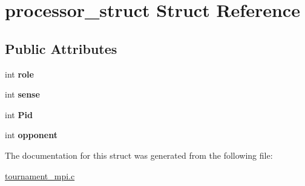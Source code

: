 \hypertarget{structprocessor__struct}{\section{processor\-\_\-struct \-Struct \-Reference}
\label{structprocessor__struct}
}
\subsection*{\-Public \-Attributes}
\begin{DoxyCompactItemize}
\item 
\hypertarget{structprocessor__struct_a797d3ab462f03421de68c0d00a2dca9d}{int {\bfseries role}}\label{structprocessor__struct_a797d3ab462f03421de68c0d00a2dca9d}

\item 
\hypertarget{structprocessor__struct_af61f03a7e74429989421bd6f45387b12}{int {\bfseries sense}}\label{structprocessor__struct_af61f03a7e74429989421bd6f45387b12}

\item 
\hypertarget{structprocessor__struct_ad952ee239a2137e1d5186f8c9a30cfb7}{int {\bfseries \-Pid}}\label{structprocessor__struct_ad952ee239a2137e1d5186f8c9a30cfb7}

\item 
\hypertarget{structprocessor__struct_a9c21bc90e7190550ba80c86f4abdc041}{int {\bfseries opponent}}\label{structprocessor__struct_a9c21bc90e7190550ba80c86f4abdc041}

\end{DoxyCompactItemize}


\-The documentation for this struct was generated from the following file\-:\begin{DoxyCompactItemize}
\item 
\hyperlink{tournament__mpi_8c}{tournament\-\_\-mpi.\-c}\end{DoxyCompactItemize}
